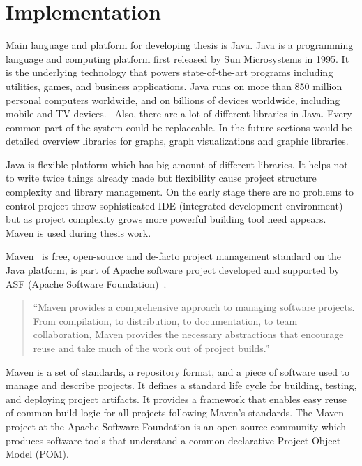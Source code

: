 \section{Implementation}
\label{sec:implementation}

Main language and platform for developing thesis is Java. Java is a programming language and computing
platform first released by Sun Microsystems in 1995. It is the underlying technology that powers state-of-the-art
programs including utilities, games, and business applications. Java runs on more than 850 million personal computers worldwide,
and on billions of devices worldwide, including mobile and TV devices.~\cite{java_com}
Also, there are a lot of different libraries in Java. Every common part of the system could be replaceable.
In the future sections would be detailed overview libraries for graphs, graph visualizations and graphic libraries.


Java is flexible platform which has big amount of different libraries. It helps not to write twice things already made but flexibility cause project structure complexity and library management. On the early stage there are no problems to control project throw sophisticated IDE (integrated development environment) but as project complexity grows more powerful building tool need appears. Maven is used during thesis work.


Maven~\cite{MAVEN_HOME_PAGE} is free, open-source and de-facto project management standard on the Java platform,
is part of Apache software project developed and supported by ASF (Apache Software Foundation)~\cite{APACHE_FOUNDATION_HOME_PAGE}.

\begin{quotation}
``Maven provides a comprehensive approach to managing software projects.
From compilation, to distribution, to documentation, to team collaboration,
Maven provides the necessary abstractions that encourage reuse and take much of the work out of project builds.''~\cite{MAVEN_BOOK_1}
\end{quotation}

Maven is a set of standards, a repository format, and a piece of software used to manage and describe projects.
It defines a standard life cycle for building, testing, and deploying project artifacts.
It provides a framework that enables easy reuse of common build logic for all projects following Maven's standards.
The Maven project at the Apache Software Foundation is an open source community which produces software tools that
understand a common declarative Project Object Model (POM).~\cite{MAVEN_BOOK_2}


